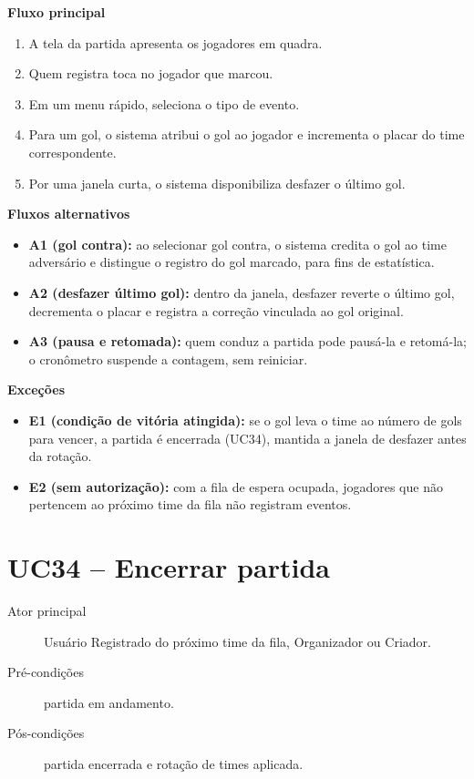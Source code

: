 \begin{apendicesenv}
        \noindent\textbf{Fluxo principal}
        \begin{enumerate}
            \item A tela da partida apresenta os jogadores em quadra.
            \item Quem registra toca no jogador que marcou.
            \item Em um menu rápido, seleciona o tipo de evento.
            \item Para um gol, o sistema atribui o gol ao jogador e incrementa o placar do time correspondente.
            \item Por uma janela curta, o sistema disponibiliza desfazer o último gol.
        \end{enumerate}

        \noindent\textbf{Fluxos alternativos}
        \begin{itemize}
            \item \textbf{A1 (gol contra):} ao selecionar gol contra, o sistema credita o gol ao time adversário e distingue o registro do gol marcado, para fins de estatística.
            \item \textbf{A2 (desfazer último gol):} dentro da janela, desfazer reverte o último gol, decrementa o placar e registra a correção vinculada ao gol original.
            \item \textbf{A3 (pausa e retomada):} quem conduz a partida pode pausá-la e retomá-la; o cronômetro suspende a contagem, sem reiniciar.
        \end{itemize}

        \noindent\textbf{Exceções}
        \begin{itemize}
            \item \textbf{E1 (condição de vitória atingida):} se o gol leva o time ao número de gols para vencer, a partida é encerrada (UC34), mantida a janela de desfazer antes da rotação.
            \item \textbf{E2 (sem autorização):} com a fila de espera ocupada, jogadores que não pertencem ao próximo time da fila não registram eventos.
        \end{itemize}

    \section*{UC34 -- Encerrar partida}
        \begin{description}
            \item[Ator principal] Usuário Registrado do próximo time da fila, Organizador ou Criador.
            \item[Pré-condições] partida em andamento.
            \item[Pós-condições] partida encerrada e rotação de times aplicada.
        \end{description}


\end{apendicesenv}
